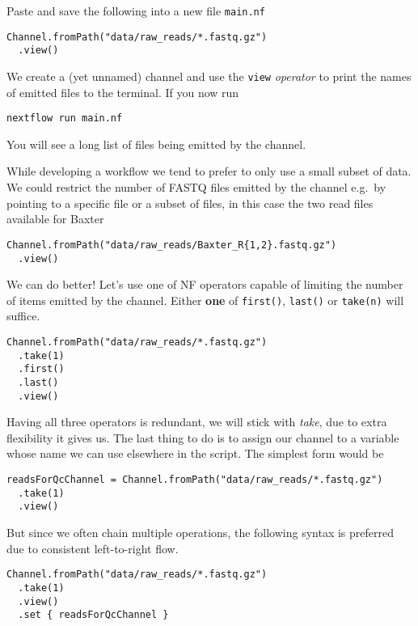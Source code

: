 \begin{steps}
Paste and save the following into a new file \texttt{main.nf}
\begin{lstlisting}
Channel.fromPath("data/raw_reads/*.fastq.gz")
  .view()
\end{lstlisting}

We create a (yet unnamed) channel and use the \texttt{view} \emph{operator} to
print the names of emitted files to the terminal. If you now run 


\begin{lstlisting}
nextflow run main.nf
\end{lstlisting}
\end{steps}

You will see a long list of files being emitted by the channel. 

While developing a workflow we tend to prefer to only use a small subset of data. 
We could restrict the number of FASTQ files emitted by the channel 
e.g.\ by pointing to a specific file or a subset of files, 
in this case the two read files available for Baxter

\begin{lstlisting}
Channel.fromPath("data/raw_reads/Baxter_R{1,2}.fastq.gz")
  .view()
\end{lstlisting}

We can do better! Let's use one of NF operators capable of limiting the number of items emitted by the channel.
Either \textbf{one} of \texttt{first()}, \texttt{last()} or \texttt{take(n)} will suffice.  


\begin{lstlisting}
Channel.fromPath("data/raw_reads/*.fastq.gz")
  .take(1) 
  .first() 
  .last() 
  .view()
\end{lstlisting}

Having all three operators is redundant, we will stick with \emph{take},
due to extra flexibility it gives us.
The last thing to do is to assign our channel to a variable whose name we can use elsewhere in the script.
The simplest form would be

\begin{lstlisting}
readsForQcChannel = Channel.fromPath("data/raw_reads/*.fastq.gz")
  .take(1)
  .view() 
\end{lstlisting}

But since we often chain multiple operations,
the following syntax is preferred due 
to consistent left-to-right flow.

\begin{lstlisting}
Channel.fromPath("data/raw_reads/*.fastq.gz")
  .take(1) 
  .view()
  .set { readsForQcChannel }
\end{lstlisting}

